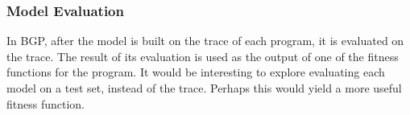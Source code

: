 
\subsubsection{Model Evaluation}
In BGP, after the model is built on the trace of each program, it is evaluated on the trace.  The result of its evaluation is used as the output of one of the fitness functions for the program.  It would be interesting to explore evaluating each model on a test set, instead of the trace.  Perhaps this would yield a more useful fitness function.

